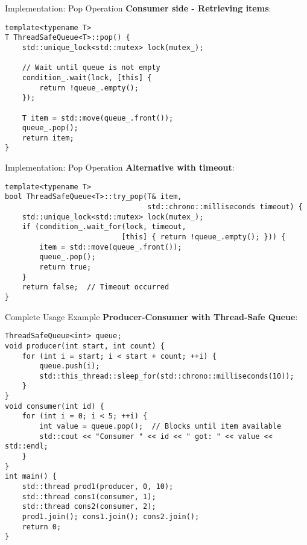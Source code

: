 \begin{frame}[fragile]{Implementation: Pop Operation}
	\textbf{Consumer side - Retrieving items}:

	\begin{verbatim}
template<typename T>
T ThreadSafeQueue<T>::pop() {
    std::unique_lock<std::mutex> lock(mutex_);

    // Wait until queue is not empty
    condition_.wait(lock, [this] {
        return !queue_.empty();
    });

    T item = std::move(queue_.front());
    queue_.pop();
    return item;
}
	\end{verbatim}
\end{frame}


\begin{frame}[fragile]{Implementation: Pop Operation}
	\textbf{Alternative with timeout}:
	\begin{verbatim}
template<typename T>
bool ThreadSafeQueue<T>::try_pop(T& item,
                                 std::chrono::milliseconds timeout) {
    std::unique_lock<std::mutex> lock(mutex_);
    if (condition_.wait_for(lock, timeout,
                           [this] { return !queue_.empty(); })) {
        item = std::move(queue_.front());
        queue_.pop();
        return true;
    }
    return false;  // Timeout occurred
}
	\end{verbatim}
\end{frame}

\begin{frame}[fragile]{Complete Usage Example}
	\textbf{Producer-Consumer with Thread-Safe Queue}:

	\begin{verbatim}
ThreadSafeQueue<int> queue;
void producer(int start, int count) {
    for (int i = start; i < start + count; ++i) {
        queue.push(i);
        std::this_thread::sleep_for(std::chrono::milliseconds(10));
    }
}
void consumer(int id) {
    for (int i = 0; i < 5; ++i) {
        int value = queue.pop();  // Blocks until item available
        std::cout << "Consumer " << id << " got: " << value << std::endl;
    }
}
int main() {
    std::thread prod1(producer, 0, 10);
    std::thread cons1(consumer, 1);
    std::thread cons2(consumer, 2);
    prod1.join(); cons1.join(); cons2.join();
    return 0;
}
	\end{verbatim}
\end{frame}

